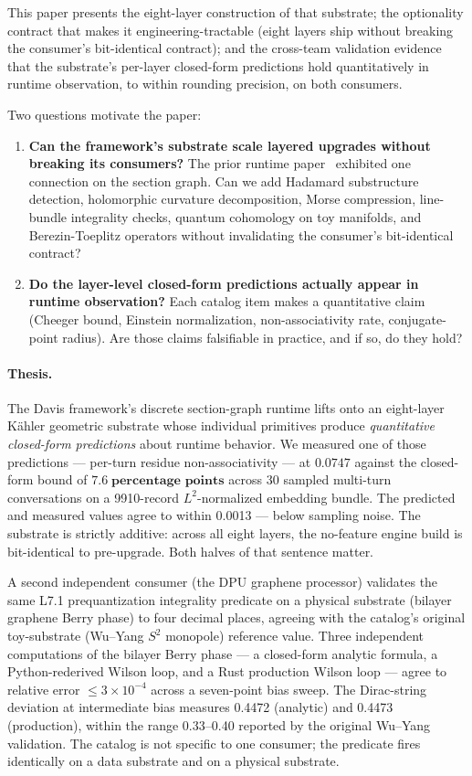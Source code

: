 \documentclass[11pt,letterpaper]{article}
\begin{document}
This paper presents the eight-layer construction of that substrate;
the optionality contract that makes it engineering-tractable (eight
layers ship without breaking the consumer's bit-identical contract);
and the cross-team validation evidence that the substrate's per-layer
closed-form predictions hold quantitatively in runtime observation,
to within rounding precision, on both consumers.

Two questions motivate the paper:

\begin{enumerate}[nosep]
\item \textbf{Can the framework's substrate scale layered upgrades
  without breaking its consumers?} The prior runtime
  paper~\cite{davis2026sheafcomposition} exhibited one connection on
  the section graph. Can we add Hadamard substructure detection,
  holomorphic curvature decomposition, Morse compression,
  line-bundle integrality checks, quantum cohomology on toy
  manifolds, and Berezin-Toeplitz operators without invalidating the
  consumer's bit-identical contract?
\item \textbf{Do the layer-level closed-form predictions actually
  appear in runtime observation?} Each catalog item makes a
  quantitative claim (Cheeger bound, Einstein normalization,
  non-associativity rate, conjugate-point radius). Are those claims
  falsifiable in practice, and if so, do they hold?
\end{enumerate}

\paragraph{Thesis.} The Davis framework's discrete section-graph
runtime lifts onto an eight-layer K\"ahler geometric substrate whose
individual primitives produce \emph{quantitative closed-form
predictions} about runtime behavior. We measured one of those
predictions --- per-turn residue non-associativity --- at
$\mathbf{0.0747}$ against the closed-form bound of
$\mathbf{7.6\;\text{percentage points}}$ across 30 sampled multi-turn
conversations on a 9910-record $L^2$-normalized embedding bundle.
The predicted and measured values agree to within 0.0013 --- below
sampling noise. The substrate is strictly additive: across all eight
layers, the no-feature engine build is bit-identical to pre-upgrade.
Both halves of that sentence matter.

A second independent consumer (the DPU graphene processor) validates
the same L7.1 prequantization integrality predicate on a physical
substrate (bilayer graphene Berry phase) to four decimal places,
agreeing with the catalog's original toy-substrate (Wu--Yang $S^2$
monopole) reference value. Three independent computations of the
bilayer Berry phase --- a closed-form analytic formula, a
Python-rederived Wilson loop, and a Rust production Wilson loop ---
agree to relative error $\leq 3 \times 10^{-4}$ across a seven-point
bias sweep. The Dirac-string deviation at intermediate bias measures
0.4472 (analytic) and 0.4473 (production), within the range
0.33--0.40 reported by the original Wu--Yang validation. The catalog
is not specific to one consumer; the predicate fires identically on
a data substrate and on a physical substrate.
\end{document}

